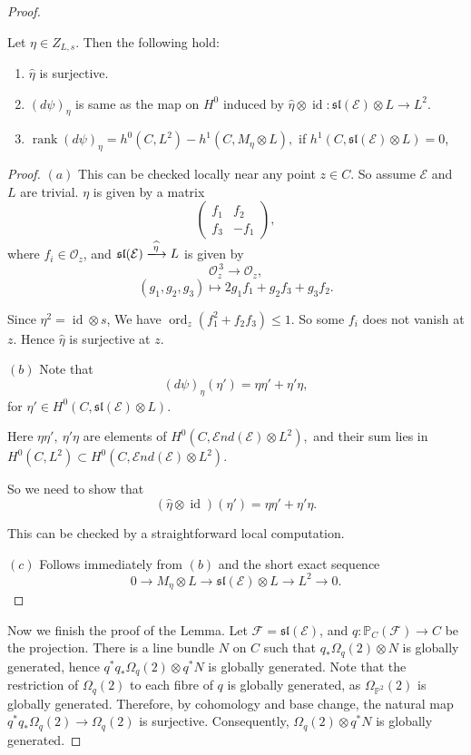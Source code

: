 \documentclass[10pt,a4paper]{amsart}
\begin{document}
\begin{proof}
\begin{claim}\label{etahat}
Let $\eta\in Z_{L,s}$. Then the following hold:

\begin{enumerate}
\item[(a)] $\widehat{\eta}$ is surjective.

\item[(b)] $(d\psi)_\eta$ is same as the map on $H^0$ induced by $\widehat{\eta}\otimes\operatorname{id}:\mathfrak{sl}(\mathcal{E})\otimes L\longrightarrow L^2.$

\item[(c)]
$\operatorname{rank}(d\psi)_\eta
=
h^0(C,L^2)-h^1(C,M_\eta\otimes L), $ if $h^1(C,\mathfrak{sl}(\mathcal{E})\otimes L)=0$,
\end{enumerate}
\end{claim}
\begin{proof}
$(a)$ This can be checked locally near any point $z\in C$.
So assume $\mathcal{E}$ and $L$ are trivial.
 $\eta$ is given by a matrix
\[
\begin{pmatrix}
f_1 & f_2\\
f_3 & -f_1
\end{pmatrix},
\]
where $f_i\in\mathcal{O}_{z}$,
and $
\mathfrak{sl}(\mathcal{E})
\xlongrightarrow{\widehat{\eta}}
L$
is given by
\[
\mathcal{O}_{z}^{\,3}
\longrightarrow
\mathcal{O}_{z},
\]
\[
(g_1,g_2,g_3)
\longmapsto
2g_1f_1+g_2f_3+g_3f_2.
\]

Since $\eta^2=\operatorname{id}\otimes s$, We have $\operatorname{ord}_z(f_1^2+f_2f_3)\le 1.$
So some $f_i$ does not vanish at $z$. Hence $\widehat{\eta}$
is surjective at $z$.

$(b)$ Note that
\[
(d\psi)_\eta(\eta')
=
\eta\eta'
+
\eta'\eta,
\]
for $\eta'\in H^0(C,\mathfrak{sl}(\mathcal{E})\otimes L).$

Here $\eta\eta',\ \eta'\eta$ are elements of 
$H^0\!\left(C,\mathcal{E}nd(\mathcal{E})\otimes L^2\right),$
and their sum lies in $H^0(C,L^2)
\subset
H^0\!\left(C,\mathcal{E}nd(\mathcal{E})\otimes L^2\right).$

So we need to show that
\[
(\widehat{\eta}\otimes\operatorname{id})(\eta')
=
\eta\eta'
+
\eta'\eta.
\]

This can be checked by a straightforward local computation.

\medskip

\noindent
$(c)$ Follows immediately from $(b)$ and the short exact sequence
\[
0
\longrightarrow
M_\eta\otimes L
\longrightarrow
\mathfrak{sl}(\mathcal{E})\otimes L
\longrightarrow
L^2
\longrightarrow
0.
\]
\end{proof}
Now we finish the proof of the Lemma. Let $\mathcal{F}=\mathfrak{sl}(\mathcal{E})$, and $q:\mathbb{P}_C(\mathcal{F})\to C$ be the projection. There is a line bundle $N$ on $C$ such that $q_*\Omega_q(2)\otimes N$ is globally generated, hence $q^*q_*\Omega_q(2)\otimes q^*N$ is globally generated. Note that the restriction of $\Omega_q(2)$ to each fibre of $q$ is globally generated, as $\Omega_{\mathbb{P}^2}(2)$ is globally generated. Therefore, by cohomology and base change, the natural map $q^*q_*\Omega_q(2)\longrightarrow \Omega_q(2)$
is surjective. Consequently, $\Omega_q(2)\otimes q^*N$ is globally generated.


\end{proof}
\end{document}
